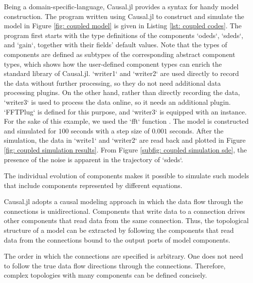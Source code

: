 \documentclass{juliacon}
\begin{document}
Being a domain-specific-language, Causal.jl provides a syntax for handy model construction. The program written using Causal.jl to construct and simulate the model in Figure \ref{fig: coupled model} is given in Listing \ref{lst: coupled codes}. The program first starts with the type definitions of the components `odeds`, `sdeds`, and `gain`, together with their fields' default values. Note that the types of components are defined as subtypes of the corresponding abstract component types, which shows how the user-defined component types can enrich the standard library of Causal.jl. `writer1` and `writer2` are used directly to record the data without further processing, so they do not need additional data processing plugins.
On the other hand, rather than directly recording the data, `writer3` is used to process the data online, so it needs an additional plugin. `FFTPlug` is defined for this purpose, and `writer3` is equipped with an instance. For the sake of this example, we used the `fft` function \cite{fftw}. The model is constructed and simulated for $100$ seconds with a step size of $0.001$ seconds. After the simulation, the data in `write1` and `writer2` are read back and plotted in Figure \ref{fig: coupled simulation results}. From Figure \ref{subfig: coupled simulation sde}, the presence of the noise is apparent in the trajectory of `sdeds`. 

The individual evolution of components makes it possible to simulate such models that include components represented by different equations. 

Causal.jl adopts a causal modeling approach in which the data flow through the connections is unidirectional. Components that write data to a connection drives other components that read data from the same connection. Thus, the topological structure of a model can be extracted by following the components that read data from the connections bound to the output ports of model components.

The order in which the connections are specified is arbitrary. One does not need to follow the true data flow directions through the connections. Therefore, complex topologies with many components can be defined concisely.
\end{document}
